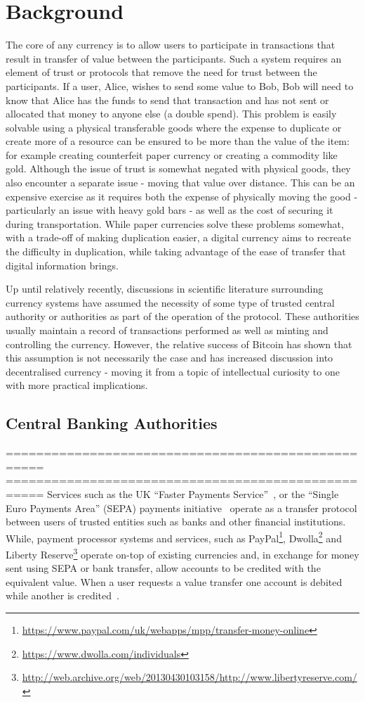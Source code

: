 \section{Background}
The core of any currency is to allow users to participate in transactions that result in transfer of value between the participants.  Such a system requires an element of trust or protocols that remove the need for trust between the participants.  If a user, Alice, wishes to send some value to Bob, Bob will need to know that Alice has the funds to send that transaction and has not sent or allocated that money to anyone else (a double spend). This problem is easily solvable using a physical transferable goods where the expense to duplicate or create more of a resource can be ensured to be more than the value of the item: for example creating counterfeit paper currency or creating a commodity like gold.  Although the issue of trust is somewhat negated with physical goods, they also encounter a separate issue - moving that value over distance.  This can be an expensive exercise as it requires both the expense of physically moving the good - particularly an issue with heavy gold bars - as well as the cost of securing it during transportation. While paper currencies solve these problems somewhat, with a trade-off of making duplication easier, a digital currency aims to recreate the difficulty in duplication, while taking advantage of the ease of transfer that digital information brings.

Up until relatively recently, discussions in scientific literature surrounding currency systems have assumed the necessity of some type of trusted central authority or authorities as part of the operation of the protocol.  These authorities usually maintain a record of transactions performed as well as minting and controlling the currency.  However, the relative success of Bitcoin has shown that this assumption is not necessarily the case and has increased discussion into decentralised currency - moving it from a topic of intellectual curiosity to one with more practical implications.

\subsection{Central Banking Authorities}

===================================================
===================================================
Services such as the UK ``Faster Payments Service''~\cite{guardian-fps}, or the ``Single Euro Payments Area'' (SEPA) payments initiative~\cite{SEPA} operate as a transfer protocol between users of trusted entities such as banks and other financial institutions.  While, payment processor systems and services, such as PayPal\footnote{\url{https://www.paypal.com/uk/webapps/mpp/transfer-money-online}}, Dwolla\footnote{\url{https://www.dwolla.com/individuals}} and Liberty Reserve\footnote{\url{http://web.archive.org/web/20130430103158/http://www.libertyreserve.com/}} operate on-top of existing currencies and, in exchange for money sent using SEPA or bank transfer, allow accounts to be credited with the equivalent value.  When a user requests a value transfer one account is debited while another is credited~\cite{paypal}.


